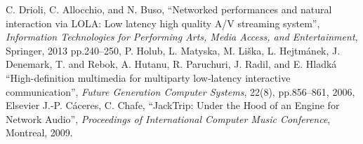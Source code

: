 C. Drioli, C. Allocchio, and N. Buso,
``Networked performances and natural interaction via LOLA: Low latency high quality A/V streaming system'',
\emph{Information Technologies for Performing Arts, Media Access, and Entertainment}, Springer, 2013
pp.240--250,
P. Holub, L. Matyska, M. Li{\v{s}}ka, L. Hejtm{\'a}nek, J. Denemark, T. and Rebok, A. Hutanu, R. Paruchuri, J. Radil, and E. Hladk{\'a}
``High-definition multimedia for multiparty low-latency interactive communication'',
\emph{Future Generation Computer Systems},
22(8),
pp.856--861,
2006,
Elsevier
J.-P. C\'{a}ceres, C. Chafe, ``JackTrip: Under the Hood of an Engine for Network Audio'', \emph{Proceedings of International Computer Music Conference}, Montreal, 2009. 

